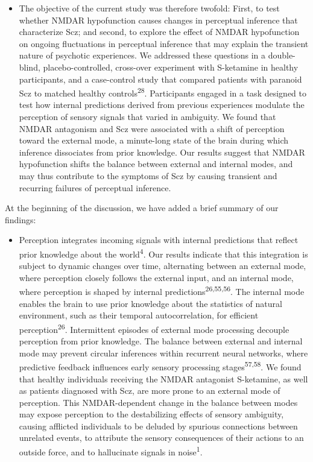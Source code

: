 \documentclass[
]{article}
\providecommand{\tightlist}{%
  \setlength{\itemsep}{0pt}\setlength{\parskip}{0pt}}
\begin{document}
\begin{itemize}
\tightlist
\item
  The objective of the current study was therefore twofold: First, to
  test whether NMDAR hypofunction causes changes in perceptual inference
  that characterize Scz; and second, to explore the effect of NMDAR
  hypofunction on ongoing fluctuations in perceptual inference that may
  explain the transient nature of psychotic experiences. We addressed
  these questions in a double-blind, placebo-controlled, cross-over
  experiment with S-ketamine in healthy participants, and a case-control
  study that compared patients with paranoid Scz to matched healthy
  controls\textsuperscript{28}. Participants engaged in a task designed
  to test how internal predictions derived from previous experiences
  modulate the perception of sensory signals that varied in ambiguity.
  We found that NMDAR antagonism and Scz were associated with a shift of
  perception toward the external mode, a minute-long state of the brain
  during which inference dissociates from prior knowledge. Our results
  suggest that NMDAR hypofunction shifts the balance between external
  and internal modes, and may thus contribute to the symptoms of Scz by
  causing transient and recurring failures of perceptual inference.
\end{itemize}

At the beginning of the discussion, we have added a brief summary of our
findings:

\begin{itemize}
\tightlist
\item
  Perception integrates incoming signals with internal predictions that
  reflect prior knowledge about the world\textsuperscript{4}. Our
  results indicate that this integration is subject to dynamic changes
  over time, alternating between an external mode, where perception
  closely follows the external input, and an internal mode, where
  perception is shaped by internal
  predictions\textsuperscript{26,55,56}. The internal mode enables the
  brain to use prior knowledge about the statistics of natural
  environment, such as their temporal autocorrelation, for efficient
  perception\textsuperscript{26}. Intermittent episodes of external mode
  processing decouple perception from prior knowledge. The balance
  between external and internal mode may prevent circular inferences
  within recurrent neural networks, where predictive feedback influences
  early sensory processing stages\textsuperscript{57,58}. We found that
  healthy individuals receiving the NMDAR antagonist S-ketamine, as well
  as patients diagnosed with Scz, are more prone to an external mode of
  perception. This NMDAR-dependent change in the balance between modes
  may expose perception to the destabilizing effects of sensory
  ambiguity, causing afflicted individuals to be deluded by spurious
  connections between unrelated events, to attribute the sensory
  consequences of their actions to an outside force, and to hallucinate
  signals in noise\textsuperscript{1}.
\end{itemize}
\end{document}

